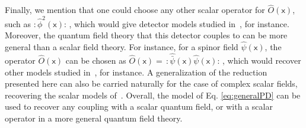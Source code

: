 \documentclass[prd,twocolumn,superscriptaddress,floatfix,amsmath,amssymb,amsfonts,longbibliography,nofootinbib]{revtex4-1}
\newcommand{\mf}{\mathsf}%
\begin{document}
Finally, we mention that one could choose any other scalar operator for $\hat{O}(\mf x)$, such as $:\!\!\hat{\phi}^2(\mf x)\!\!:\,$, which would give detector models studied in~\cite{eduAchimBosonFermion,Sachs1,sachs2018entanglement}, for instance. Moreover, the quantum field theory that this detector couples to can be more general than a scalar field theory. For instance, for a spinor field $\hat{\psi}(\mf x)$, the operator $\hat{O}(\mf x)$ can be chosen as $\hat{O}(\mf x) \!= \,:\!\!\hat{\bar{\psi}}(\mf x) \hat{\psi}(\mf x)\!\!:\,$, which would recover other models studied in~\cite{eduAchimBosonFermion,Sachs1,sachs2018entanglement}, for instance. A generalization of the reduction presented here can also be carried naturally for the case of complex scalar fields, recovering the scalar models of~\cite{neutrinos,antiparticles,carol}. Overall, the model of Eq. \eqref{eq:generalPD} can be used to recover any coupling with a scalar quantum field, or with a scalar operator in a more general quantum field theory.





\end{document}
